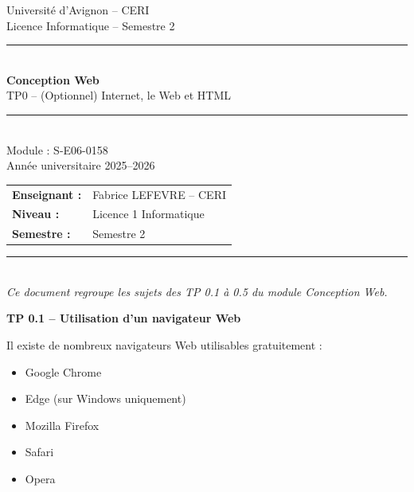 \documentclass[11pt]{article}
\begin{document}
\thispagestyle{empty}
\vspace*{3cm}

\begin{center}
    {\small\textcolor{violetuniv}{Université d'Avignon -- CERI}}\\[0.5cm]
    {\small\textcolor{violetuniv}{Licence Informatique -- Semestre 2}}\\[2cm]

    {\rule{\linewidth}{0.5pt}}\\[0.4cm]
    {\LARGE\bfseries Conception Web}\\[0.3cm]
    {\large TP0 -- (Optionnel) Internet, le Web et HTML}\\[0.4cm]
    {\rule{\linewidth}{0.5pt}}\\[2cm]

    {\large Module : S-E06-0158}\\[0.5cm]
    {\large Année universitaire 2025--2026}\\[3cm]

    \begin{tabular}{ll}
        \textbf{Enseignant :} & Fabrice LEFEVRE -- CERI \\
        \textbf{Niveau :}     & Licence 1 Informatique \\
        \textbf{Semestre :}   & Semestre 2 \\
    \end{tabular}
\end{center}

\vfill

\begin{center}
    \textcolor{borduregrise}{\rule{\linewidth}{0.3pt}}\\[0.3cm]
    {\small\textit{Ce document regroupe les sujets des TP 0.1 à 0.5 du module Conception Web.}}
\end{center}
\newpage
{}

{\Large\bfseries TP 0.1 -- Utilisation d'un navigateur Web}

\bigskip

Il existe de nombreux navigateurs Web utilisables gratuitement :

\begin{itemize}
    \item Google Chrome
    \item Edge (sur Windows uniquement)
    \item Mozilla Firefox
    \item Safari
    \item Opera
\end{itemize}
\end{document}
